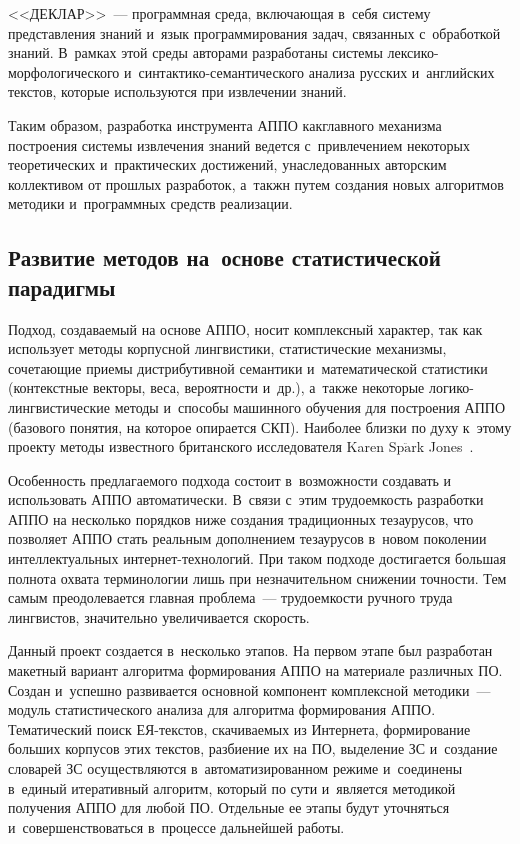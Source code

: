 \begin{multicols}{2}
\begin{description}
     <<ДЕКЛАР>>~--- программная среда, включающая в~себя систему
представления знаний и~язык программирования задач, связанных с~обработкой знаний. В~рамках этой среды авторами разработаны системы
лек\-си\-ко-мор\-фо\-ло\-ги\-че\-ско\-го
     и~син\-так\-ти\-ко-се\-ман\-ти\-че\-ско\-го анализа русских и~английских текстов, которые используются при извлечении знаний.
    \end{description}
     Таким образом, разработка инструмента \mbox{АППО} как\linebreak главного
механизма построения системы извлечения знаний ведется с~привлечением некоторых теоре\-тических и~практических достижений,
уна\-сле\-до\-ван\-ных авторским коллективом от прошлых разработок, а~такжн путем
создания новых алгоритмов методики и~программных средств реализации.

\vspace*{-3pt}

     \subsection{Развитие методов на~основе статистической парадигмы}

     \vspace*{-1pt}

     Подход, создаваемый на основе АППО, носит комплексный характер,
так как использует методы корпусной лингвистики, статистические
механизмы, сочетающие приемы дистрибутивной семантики и~математической статистики (контекстные векторы, веса, вероятности и~др.),
а~также некоторые ло\-ги\-ко-линг\-ви\-сти\-че\-ские методы и~способы
машинного обучения для построения АППО (базового понятия, на которое
опирается СКП). Наиболее
близки по духу к~этому проекту методы известного британского
исследователя Karen Sp$\ddot{\mbox{a}}$rk Jones~\cite{17-koz, 18-koz, 19-koz}.

     Особенность предлагаемого подхода состоит в~возможности создавать
и использовать \mbox{АППО} автоматически. В~связи с~этим трудоемкость
разработки \mbox{АППО} на несколько порядков ниже создания традиционных
тезаурусов, что позволяет \mbox{АППО} стать реальным дополнением тезаурусов в~новом поколении интеллектуальных ин\-тер\-нет-тех\-но\-ло\-гий. При таком
подходе достигается большая полнота охвата терминологии лишь при
незначительном снижении точности. Тем самым преодолева\-ется главная
проб\-ле\-ма~--- трудоемкости ручного труда лингвистов, значительно
увеличивается ско\-рость.

     Данный проект создается в~несколько этапов. На первом этапе был
разработан макетный вариант алгоритма формирования АППО на материале
различных ПО. Создан и~успешно развивается основной
компонент комплексной методики~--- модуль статистического анализа для
алгоритма формирования АППО. Тематический поиск ЕЯ-текс\-тов, скачиваемых из Интернета,
формирование больших корпусов этих текстов, разбиение их на
ПО, выделение ЗС и~создание словарей ЗС
осуществляются в~автоматизированном режиме и~соединены в~единый
итеративный алгоритм, который по сути и~является методикой получения
АППО для любой ПО. Отдельные ее этапы будут
уточняться и~совершенствоваться в~процессе дальнейшей работы.


\end{multicols}
